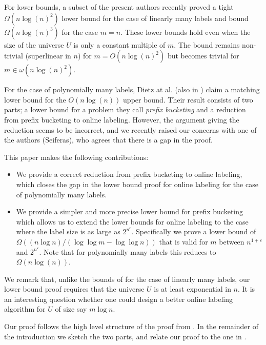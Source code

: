\documentclass[runningheads,a4paper]{llncs}
\begin{document}
For lower bounds, a subset of the present authors 
recently proved \cite{BKS} a tight $\Omega(n \log(n)^2)$ lower bound for the case of linearly many labels and bound $\Omega(n \log(n)^3)$ for
the case $m=n$. These lower bounds hold even when the size of the universe $U$ is only a constant multiple of $m$.  The bound remains
non-trivial (superlinear in $n$) for $m  = O(n \log(n)^2)$ but
becomes trivial  for $m \in \omega(n \log(n)^2)$. 

For the case of polynomially many labels,
Dietz at al. \cite{DSZ04} (also in \cite{Zhang}) claim a matching lower bound for the $O(n \log(n))$ upper bound.
Their result consists of two parts; a lower bound for a problem they call {\em prefix bucketing}
and a reduction from  prefix bucketing to online labeling.  However, the argument giving the reduction seems to be incorrect, 
and we recently raised our concerns with one of the authors (Seiferas), who agrees that
there is a gap in the proof. 

This paper makes the following contributions:

\begin{itemize}
\item We provide a correct reduction from prefix bucketing to  online labeling, which closes the gap in the lower
bound proof for online labeling for the case of polynomially many labels.
\item We provide a simpler and more precise lower bound for prefix bucketing which allows us to extend the lower bounds
for online labeling to the case where the label size is as large as $2^{n^\epsilon}$.
Specifically we prove a lower bound of $\Omega((n \log n) / (\log \log m - \log \log n))$ that is valid
for $m$ between $n^{1+\varepsilon}$ and $2^{n^{\varepsilon}}$.   Note that for
polynomially many labels this reduces to $\Omega(n \log(n))$. 
\end{itemize}

We remark that, unlike the bounds of \cite{BKS} for the case of linearly many labels, our lower bound proof requires that the universe
$U$ is at least exponential in $n$. It is an interesting question whether one could design
a better online labeling algorithm for $U$ of size say $m \log n$. 

Our proof follows the high level structure of the proof from \cite{DSZ04}.  In the remainder of the introduction we sketch the two
parts, and relate our proof to the one in \cite{DSZ04}.
\end{document}
